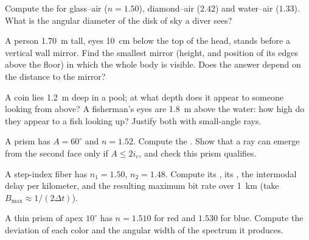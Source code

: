 \begin{exercise}[$\star$]\label{exo:b1:rays-reflection-refraction:3}
Compute the  for glass--air ($n = 1.50$), diamond--air
($2.42$) and water--air ($1.33$). What is the angular diameter of the
disk of sky a diver sees?
\end{exercise}

\begin{exercise}[$\star$]\label{exo:b1:rays-reflection-refraction:4}
A person \qty{1.70}{m} tall, eyes \qty{10}{cm} below the top of the
head, stands before a vertical wall mirror. Find the smallest mirror
(height, and position of its edges above the floor) in which the whole
body is visible. Does the answer depend on the distance to the mirror?
\end{exercise}

\begin{exercise}[$\star\star$]\label{exo:b1:rays-reflection-refraction:5}
A coin lies \qty{1.2}{m} deep in a pool; at what depth does it appear
to someone looking from above? A fisherman's eyes are \qty{1.8}{m}
above the water: how high do they appear to a fish looking up? Justify
both with small-angle rays.
\end{exercise}

\begin{exercise}[$\star\star$]\label{exo:b1:rays-reflection-refraction:6}
A prism has $A = 60^\circ$ and $n = 1.52$. Compute the . Show that a ray can emerge from the second face only if
$A \leq 2 i_c$, and check this prism qualifies.
\end{exercise}

\begin{exercise}[$\star\star$]\label{exo:b1:rays-reflection-refraction:7}
A step-index fiber has $n_1 = 1.50$, $n_2 = 1.48$. Compute its
, its , the intermodal delay per
kilometer, and the resulting maximum bit rate over \qty{1}{km}
(take $B_{\max} \approx 1/(2\Delta t)$).
\end{exercise}

\begin{exercise}[$\star\star$]\label{exo:b1:rays-reflection-refraction:8}
A thin prism of apex $10^\circ$ has $n = 1.510$ for red and $1.530$ for
blue. Compute the deviation of each color and the angular width of the
spectrum it produces.
\end{exercise}

